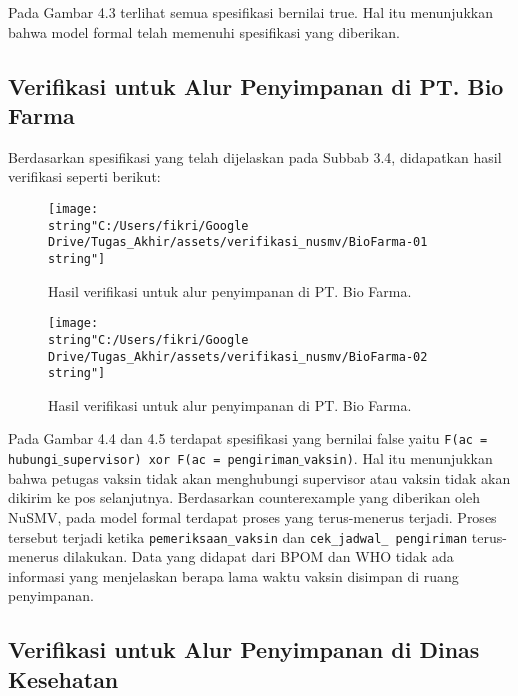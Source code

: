 Pada Gambar 4.3 terlihat semua spesifikasi bernilai true. Hal itu
menunjukkan bahwa model formal telah memenuhi spesifikasi yang diberikan.

\subsection{Verifikasi untuk Alur Penyimpanan di PT. Bio Farma}

Berdasarkan spesifikasi yang telah dijelaskan pada Subbab 3.4, didapatkan
hasil verifikasi seperti berikut:

\begin{figure}[H]
	\begin{centering}
		\texttt{[image: \\string"C:/Users/fikri/Google Drive/Tugas\_Akhir/assets/verifikasi\_nusmv/BioFarma-01\\string"]}
		\par
	\end{centering}
	
	\caption{Hasil verifikasi untuk alur penyimpanan di PT. Bio Farma.}
	
\end{figure}

\begin{figure}[H]
	\begin{centering}
		\texttt{[image: \\string"C:/Users/fikri/Google Drive/Tugas\_Akhir/assets/verifikasi\_nusmv/BioFarma-02\\string"]}
		\par
	\end{centering}
	
	\caption{Hasil verifikasi untuk alur penyimpanan di PT. Bio Farma.}
	
\end{figure}

Pada Gambar 4.4 dan 4.5 terdapat spesifikasi yang bernilai false yaitu
\texttt{F(ac = hubungi$\_$supervisor) xor F(ac = pengiriman$\_$vaksin)}. Hal itu
menunjukkan bahwa petugas vaksin tidak akan menghubungi supervisor atau
vaksin tidak akan dikirim ke pos selanjutnya. Berdasarkan counterexample
yang diberikan oleh NuSMV, pada model formal terdapat proses yang
terus-menerus terjadi. Proses tersebut terjadi ketika \texttt{pemeriksaan\_vaksin} dan \texttt{cek\_jadwal\_ pengiriman} terus-menerus dilakukan. Data yang
didapat dari BPOM dan WHO tidak ada informasi yang menjelaskan berapa
lama waktu vaksin disimpan di ruang penyimpanan.

\subsection{Verifikasi untuk Alur Penyimpanan di Dinas Kesehatan}

